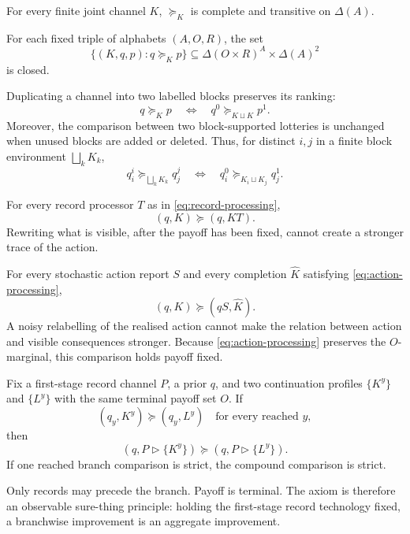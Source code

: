 \documentclass[11pt,a4paper]{article}
\theoremstyle{definition}
\newcommand{\D}{\Delta}
\newcommand{\1}{\mathbf 1}
\begin{document}
\begin{description}[leftmargin=*,style=sameline]

\item[(A1) Weak order.]
For every finite joint channel $K$, $\succeq_K$ is complete and transitive on $\D(A)$.

\item[(A2) Continuity.]
For each fixed triple of alphabets $(A,O,R)$, the set
\[
 \{(K,q,p):q\succeq_Kp\}
 \subseteq \D(O\times R)^A\times\D(A)^2
\]
is closed.

\item[(A3) Block-comparison coherence.]
Duplicating a channel into two labelled blocks preserves its ranking:
\[
 q\succeq_Kp
 \quad\Longleftrightarrow\quad
 q^0\succeq_{K\sqcup K}p^1.
\]
Moreover, the comparison between two block-supported lotteries is unchanged when unused blocks are added or deleted.
Thus, for distinct $i,j$ in a finite block environment $\bigsqcup_kK_k$,
\[
 q_i^i\succeq_{\bigsqcup_kK_k}q_j^j
 \quad\Longleftrightarrow\quad
 q_i^0\succeq_{K_i\sqcup K_j}q_j^1.
\]

\item[(A4) Record data processing.]
For every record processor $T$ as in \eqref{eq:record-processing},
\[
 (q,K)\succeq(q,KT).
\]
Rewriting what is visible, after the payoff has been fixed, cannot create a stronger trace of the action.

\item[(A5) Action data processing.]
For every stochastic action report $S$ and every completion $\widehat K$ satisfying
\eqref{eq:action-processing},
\[
 (q,K)\succeq(qS,\widehat K).
\]
A noisy relabelling of the realised action cannot make the relation between action and visible consequences stronger.
Because \eqref{eq:action-processing} preserves the $O$-marginal, this comparison holds payoff fixed.

\item[(A6) Branchwise continuation consistency.]
Fix a first-stage record channel $P$, a prior $q$, and two continuation profiles $\{K^y\}$ and $\{L^y\}$ with the
same terminal payoff set $O$.  If
\[
 (q_y,K^y)\succeq(q_y,L^y)
 \quad\text{for every reached }y,
\]
then
\[
 (q,P\triangleright\{K^y\})
 \succeq
 (q,P\triangleright\{L^y\}).
\]
If one reached branch comparison is strict, the compound comparison is strict.

Only records may precede the branch.  Payoff is terminal.  The axiom is therefore an observable sure-thing principle:
holding the first-stage record technology fixed, a branchwise improvement is an aggregate improvement.


\end{description}
\end{document}
